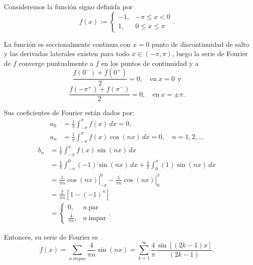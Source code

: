 

\begin{ejemplo} \label{Signo}
Consideremos la función signo  definida por
$$f(x) := \left\{ \begin{array}{cc}
     -1,& - \pi \leq x < 0  \\
     1,&   0 \leq x \leq \pi
\end{array} \right. .$$

La función es seccionalmente continua con $x = 0$ punto de discontinuidad de salto y las derivadas laterales existen para todo $x \in (-\pi,\pi)$, luego la serie de Fourier de $f$ converge puntualmente a $f$ en los puntos de continuidad y a 
$$\frac{f(0^-) + f(0^+)}{2} = 0, \quad \mbox{en} ~ x = 0 ~~\mbox{y}$$
$$\frac{f(-\pi^+) + f(\pi^-)}{2} = 0, \quad \mbox{en} ~ x = \pm \pi. $$

Sus coeficientes de Fourier están dados por:
\begin{align*}
    a_0 &= \frac{1}{\pi} \int_{-\pi}^{\pi} f(x) \,dx = 0 , \\
    a_n &= \frac{1}{\pi} \int_{-\pi}^{\pi} f(x) \cos(n x)\,dx = 0, \quad n = 1,2,\dots
\end{align*}
\begin{align*}
     b_n &= \frac{1}{\pi} \int_{-\pi}^{\pi} f(x) \sin(nx) \,dx \\
     &= \frac{1}{\pi} \int_{-\pi}^0 (-1) \sin(nx)\,dx + \frac{1}{\pi} \int_{0}^{\pi} (1) \sin(nx) \,dx \\
     &= \left.  \frac{1}{\pi n} \cos(nx) \right|_{-\pi}^0 - \left. \frac{1}{\pi n} \cos(nx) \right|_{0}^{\pi} \\
     &= \frac{2}{\pi n} [1 - (-1)^n] \\
     &= \left\{ \begin{array}{cl}
         0, & n ~\mbox{par}  \\
         \frac{4}{\pi n}, &  n ~\mbox{impar}
     \end{array} \right. .
\end{align*}

Entonces, su serie de Fourier es 
$$f(x) =  \sum_{n ~impar} \frac{4}{\pi n} \sin(nx) = \sum_{k=1}^{\infty} \frac{4}{\pi} \frac{\sin[(2k-1)x]}{ (2k-1)}.$$


\end{ejemplo}

